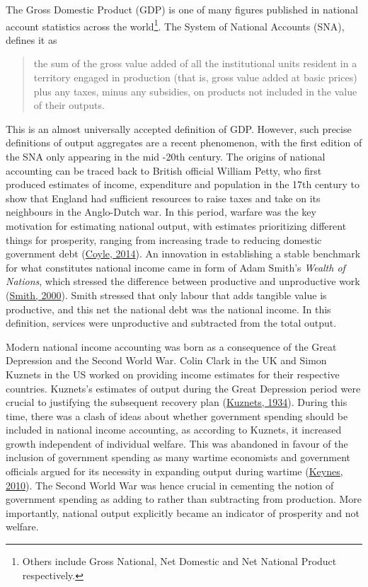\documentclass[12pt,nobind, a4paper]{reedthesis}
\begin{document}
 The Gross Domestic Product (GDP) is one of many figures published in national account statistics across the world\footnote{Others include Gross National, Net Domestic and Net National Product respectively.}. The System of National Accounts (SNA), defines it as
 \begin{quote}
 the sum of the gross value added of all the institutional units resident in a territory engaged in production (that is, gross value added at basic prices) plus any taxes, minus any subsidies, on products not included in the value of their 
 outputs.
 \end{quote}
 This is an almost universally accepted definition of GDP. However, such precise definitions of output aggregates are a recent phenomenon, with the first edition of the SNA only appearing in the mid -20th century. The origins of national accounting can be traced back to British official William Petty, who first produced estimates of income, expenditure and population in the 17th century to show that England had sufficient resources to raise taxes and take on its neighbours in the Anglo-Dutch war. In this period, warfare was the key motivation for estimating national output, with estimates prioritizing different things for prosperity, ranging from increasing trade to reducing domestic government debt (\protect\hyperlink{ref-coyle_gdp_2014}{Coyle, 2014}). An innovation in establishing a stable benchmark for what constitutes national income came in form of Adam Smith's \emph{Wealth of Nations}, which stressed the difference between productive and unproductive work (\protect\hyperlink{ref-smith_wealth_2000}{Smith, 2000}). Smith stressed that only labour that adds tangible value is productive, and this net the national debt was the national income. In this definition, services were unproductive and subtracted from the total output.
 \linebreak

 Modern national income accounting was born as a consequence of the Great Depression and the Second World War. Colin Clark in the UK and Simon Kuznets in the US worked on providing income estimates for their respective countries. Kuznets's estimates of output during the Great Depression period were crucial to justifying the subsequent recovery plan (\protect\hyperlink{ref-kuznets_national_1934}{Kuznets, 1934}). During this time, there was a clash of ideas about whether government spending should be included in national income accounting, as according to Kuznets, it increased growth independent of individual welfare. This was abandoned in favour of the inclusion of government spending as many wartime economists and government officials argued for its necessity in expanding output during wartime (\protect\hyperlink{ref-keynes_how_2010}{Keynes, 2010}). The Second World War was hence crucial in cementing the notion of government spending as adding to rather than subtracting from production. More importantly, national output explicitly became an indicator of prosperity and not welfare.
 \linebreak
\end{document}
